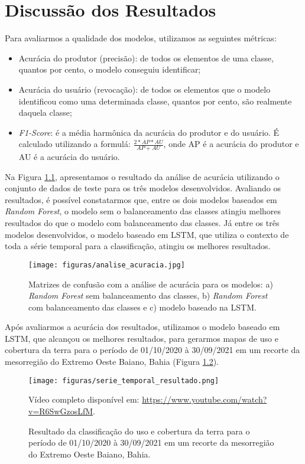 \chapter{Discussão dos Resultados}

Para avaliarmos a qualidade dos modelos, utilizamos as seguintes métricas: 

\begin{itemize}
    \item Acurácia do produtor (precisão): de todos os elementos de uma classe, quantos por cento, o modelo conseguiu identificar; 
    \item Acurácia do usuário (revocação): de todos os elementos que o modelo identificou como uma determinada classe, quantos por cento, são realmente daquela classe; 
    \item \textit{F1-Score}: é a média harmônica da acurácia do produtor e do usuário. É calculado utilizando a formulá: $\frac{2 * AP * AU}{AP + AU}$, onde AP é a acurácia do produtor e AU é a acurácia do usuário.
\end{itemize}

Na Figura \ref{fig:analise_acuracia}, apresentamos o resultado da análise de acurácia utilizando o conjunto de dados de teste para os três modelos desenvolvidos. Avaliando os resultados, é possível constatarmos que, entre os dois modelos baseados em \textit{Random Forest}, o modelo sem o balanceamento das classes atingiu melhores resultados do que o modelo com balanceamento das classes. Já entre os três modelos desenvolvidos, o modelo baseado em LSTM, que utiliza o contexto de toda a série temporal para a classificação, atingiu os melhores resultados. 

\begin{figure}[H]
\caption{Matrizes de confusão com a análise de acurácia para os modelos: a) \textit{Random Forest} sem balanceamento das classes, b) \textit{Random Forest} com balanceamento das classes e c) modelo baseado na LSTM.}
\label{fig:analise_acuracia}
\centering
\texttt{[image: figuras/analise\_acuracia.jpg]}
\end{figure}

Após avaliarmos a acurácia dos resultados, utilizamos o modelo baseado em LSTM, que alcançou os melhores resultados, para gerarmos mapas de uso e cobertura da terra para o período de 01/10/2020 à 30/09/2021 em um recorte da mesorregião do Extremo Oeste Baiano, Bahia (Figura \ref{fig:serie_temporal_resultado}). 

\begin{figure}[H]
\caption{Resultado da classificação do uso e cobertura da terra para o período de 01/10/2020 à 30/09/2021 em um recorte da mesorregião do Extremo Oeste Baiano, Bahia. }
\label{fig:serie_temporal_resultado}
\centering
\texttt{[image: figuras/serie\_temporal\_resultado.png]}
\begin{tablenotes}
\item Vídeo completo disponível em: \url{https://www.youtube.com/watch?v=R6SwGzosLfM}.
\end{tablenotes}
\end{figure}

